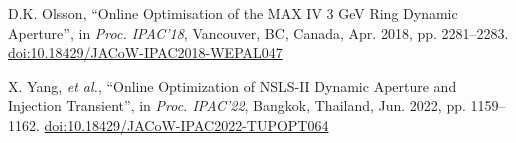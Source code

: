 \documentclass[a4paper,
               keeplastbox,   %
               ]{jacow}
\begin{document}
\begin{thebibliography}{9}
       D.K. Olsson,
       \textquotedblleft{Online Optimisation of the MAX IV 3 GeV Ring Dynamic Aperture}\textquotedblright,
       in \emph{Proc. IPAC'18}, Vancouver, BC, Canada, Apr. 2018, pp. 2281--2283.
       \url{doi:10.18429/JACoW-IPAC2018-WEPAL047}
    
        X. Yang, \emph{et al.},
       \textquotedblleft{Online Optimization of NSLS-II Dynamic Aperture and Injection Transient}\textquotedblright,
        in \emph{Proc. IPAC'22}, Bangkok, Thailand, Jun. 2022, pp. 1159--1162.
       \url{doi:10.18429/JACoW-IPAC2022-TUPOPT064}
    
   
	\end{thebibliography}

%
% 

%
\end{document}
